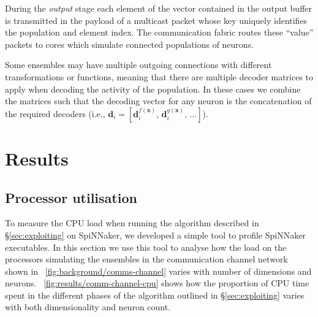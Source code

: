 \documentclass[conference]{IEEEtran}
\renewcommand{\vec}{\mathbf}  %
\begin{document}
  During the \textit{output} stage each element of the vector contained in the output buffer is transmitted in the payload of a multicast packet whose key uniquely identifies the population and element index.
  The communication fabric routes these ``value'' packets to cores which simulate connected populations of neurons.

  Some ensembles may have multiple outgoing connections with different transformations or functions, meaning that there are multiple decoder matrices to apply when decoding the activity of the population.
  In these cases we combine the matrices such that the decoding vector for any neuron is the concatenation of the required decoders
  (i.e., $\vec{d}_i = \left[\vec{d}_i^{f(\vec{x})},\,\vec{d}_i^{g(\vec{x})},\,\ldots \right]$).

  \section{Results}
  \label{sec:results}

  \subsection{Processor utilisation}
To measure the CPU load when running the algorithm described in \S\ref{sec:exploiting} on SpiNNaker, we developed a simple tool to profile SpiNNaker executables.
In this section we use this tool to analyse how the load on the processors simulating the ensembles in the communication channel network shown in \figurename~\ref{fig:background/comms-channel} varies with number of dimensions and neurons.
\figurename~\ref{fig:results/comm-channel-cpu} shows how the proportion of CPU time spent in the different phases of the algorithm outlined in \S\ref{sec:exploiting} varies with both dimensionality and neuron count.
\end{document}
